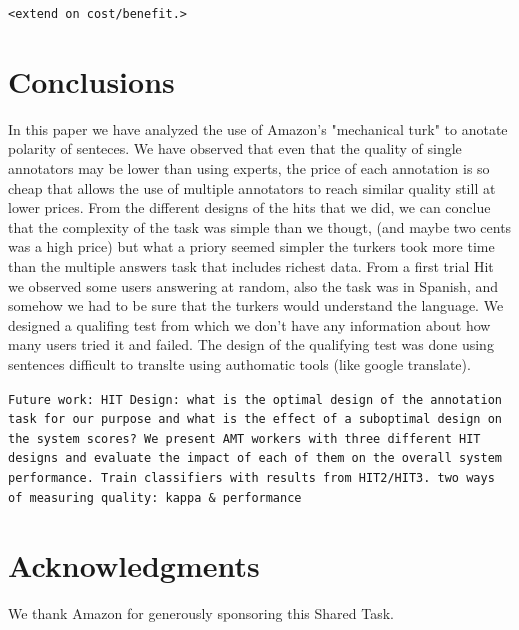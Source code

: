 \documentclass[11pt,letterpaper]{article}
\begin{document}
\texttt{<extend on cost/benefit.>}

\section{Conclusions}
In this paper we have analyzed the use of Amazon's "mechanical turk" to anotate polarity of senteces. We have observed that even that the quality of single annotators may be lower than using experts, the price of each annotation is so cheap that allows the use of multiple annotators to reach similar quality still at lower prices. 
From the different designs of the hits that we did, we can conclue that the complexity of the task was simple than we thougt, (and maybe two cents was a high price) but what a priory seemed simpler the turkers took more time than the multiple answers task that includes richest data. From a first trial Hit we observed some users answering at random, also the task was in Spanish, and somehow we had to be sure that the turkers would understand the language. We designed a qualifing test from which we don't have any information about how many users tried it and failed. The design of the qualifying test was done using sentences difficult to translte using authomatic tools (like google translate).
  
\label{sect:conclusions}
\texttt{Future work: HIT Design: what is the optimal design of the annotation task for our purpose and what is the effect of a suboptimal design on the system scores? We present AMT workers with three different HIT designs and evaluate the impact of each of them on the overall system performance. Train classifiers with results from HIT2/HIT3. two ways of measuring quality: kappa \& performance}

\section*{Acknowledgments}
We thank Amazon for generously sponsoring this Shared Task.



\end{document}
